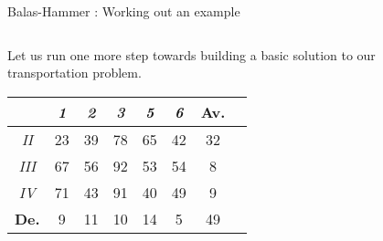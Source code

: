 \documentclass[32pt,aspectratio=169]{beamer}
\begin{document}
\begin{frame}{Balas-Hammer : Working out an example}
  \begin{columns}
    \begin{column}{.6\textwidth}
      \vfill
      
      Let us run one more step towards building a basic solution to
      our transportation problem.
      \vspace{1.3\baselineskip}

      \begin{overlayarea}{\textwidth}{.5\textheight}      
        \vspace{.22cm}
        \small{
          \begin{tabular}{c|c|c|c|c|c|c|r}
            & \textit{1} & \textit{2} & \textit{3} & \textit{5} & \textit{6} & \cellcolor{blue!50}\textbf{Av.}  \\
            \hline
            \textit{II} & \cellcolor{blue!25}23 & \cellcolor{blue!25}39 & \cellcolor{blue!25}78 &  \cellcolor{blue!25}65 & \cellcolor{blue!25}42 & \cellcolor{blue!50}32 \\
            \hline
            \textit{III} & \cellcolor{blue!25}67 & \cellcolor{blue!25}56 & \cellcolor{blue!25}92 & \cellcolor{blue!25}53 & \cellcolor{blue!25}54 & \cellcolor{blue!50}8 \\
            \hline
            \textit{IV} & \cellcolor{blue!25}71 & \cellcolor{blue!25}43 & \cellcolor{blue!25}91 & \cellcolor{blue!25}40 & \cellcolor{blue!25}49 & \cellcolor{blue!50}9 \\
            \hline 
            \cellcolor{blue!50}\textbf{De.} & \cellcolor{blue!50}9 & \cellcolor{blue!50}11 & \cellcolor{blue!50}10 & \cellcolor{blue!50}14 & \cellcolor{blue!50}5 & \cellcolor{blue!60}49  \\
          \end{tabular}
        }
      \end{overlayarea}
    \end{column}
    \begin{column}{.4\textwidth}
\end{column}
\end{columns}
\end{frame}
\end{document}
